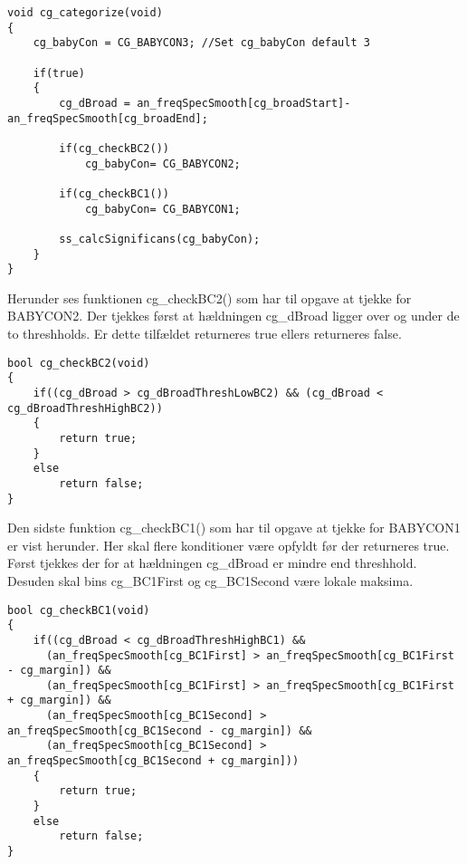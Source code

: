 \begin{verbatim}
void cg_categorize(void)
{
	cg_babyCon = CG_BABYCON3; //Set cg_babyCon default 3

	if(true)
	{
		cg_dBroad = an_freqSpecSmooth[cg_broadStart]-an_freqSpecSmooth[cg_broadEnd];

		if(cg_checkBC2())
			cg_babyCon= CG_BABYCON2;

		if(cg_checkBC1())
			cg_babyCon= CG_BABYCON1;

		ss_calcSignificans(cg_babyCon);
	}
}
\end{verbatim}

Herunder ses funktionen cg\_checkBC2() som har til opgave at tjekke for BABYCON2. 
Der tjekkes først at hældningen cg\_dBroad ligger over og under de to threshholds. Er dette tilfældet returneres true ellers returneres false. 

\begin{verbatim}
bool cg_checkBC2(void)
{
	if((cg_dBroad > cg_dBroadThreshLowBC2) && (cg_dBroad < cg_dBroadThreshHighBC2))
	{
		return true;
	}
	else
		return false;
}
\end{verbatim}

Den sidste funktion cg\_checkBC1() som har til opgave at tjekke for BABYCON1 er vist herunder. 
Her skal flere konditioner være opfyldt før der returneres true. Først tjekkes der for at hældningen cg\_dBroad er mindre end threshhold. Desuden skal bins cg\_BC1First og cg\_BC1Second være lokale maksima. 

\begin{verbatim}
bool cg_checkBC1(void)
{
	if((cg_dBroad < cg_dBroadThreshHighBC1) &&
	  (an_freqSpecSmooth[cg_BC1First] > an_freqSpecSmooth[cg_BC1First - cg_margin]) &&
	  (an_freqSpecSmooth[cg_BC1First] > an_freqSpecSmooth[cg_BC1First + cg_margin]) &&
	  (an_freqSpecSmooth[cg_BC1Second] > an_freqSpecSmooth[cg_BC1Second - cg_margin]) &&
	  (an_freqSpecSmooth[cg_BC1Second] > an_freqSpecSmooth[cg_BC1Second + cg_margin]))
	{
		return true;
	}
	else
		return false;
}
\end{verbatim}
